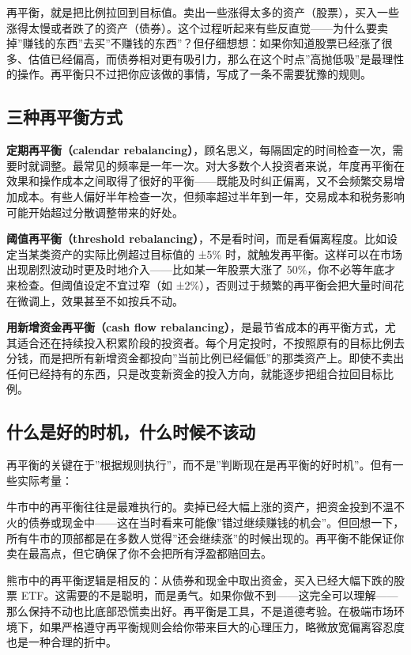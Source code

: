\documentclass[a4paper,11pt,oneside,fontset=none,UTF8,zihao=-4]{ctexbook}
\begin{document}
再平衡，就是把比例拉回到目标值。卖出一些涨得太多的资产（股票），买入一些涨得太慢或者跌了的资产（债券）。这个过程听起来有些反直觉------为什么要卖掉''赚钱的东西''去买''不赚钱的东西''？但仔细想想：如果你知道股票已经涨了很多、估值已经偏高，而债券相对更有吸引力，那么在这个时点''高抛低吸''是最理性的操作。再平衡只不过把你应该做的事情，写成了一条不需要犹豫的规则。

\subsection{三种再平衡方式}\label{ux4e09ux79cdux518dux5e73ux8861ux65b9ux5f0f}

\textbf{定期再平衡（calendar
rebalancing）}，顾名思义，每隔固定的时间检查一次，需要时就调整。最常见的频率是一年一次。对大多数个人投资者来说，年度再平衡在效果和操作成本之间取得了很好的平衡------既能及时纠正偏离，又不会频繁交易增加成本。有些人偏好半年检查一次，但频率超过半年到一年，交易成本和税务影响可能开始超过分散调整带来的好处。

\textbf{阈值再平衡（threshold
rebalancing）}，不是看时间，而是看偏离程度。比如设定当某类资产的实际比例超过目标值的
±5\%
时，就触发再平衡。这样可以在市场出现剧烈波动时更及时地介入------比如某一年股票大涨了
50\%，你不必等年底才来检查。但阈值设定不宜过窄（如
±2\%），否则过于频繁的再平衡会把大量时间花在微调上，效果甚至不如按兵不动。

\textbf{用新增资金再平衡（cash flow
rebalancing）}，是最节省成本的再平衡方式，尤其适合还在持续投入积累阶段的投资者。每个月定投时，不按照原有的目标比例去分钱，而是把所有新增资金都投向''当前比例已经偏低''的那类资产上。即使不卖出任何已经持有的东西，只是改变新资金的投入方向，就能逐步把组合拉回目标比例。

\subsection{什么是好的时机，什么时候不该动}\label{ux4ec0ux4e48ux662fux597dux7684ux65f6ux673aux4ec0ux4e48ux65f6ux5019ux4e0dux8be5ux52a8}

再平衡的关键在于''根据规则执行''，而不是''判断现在是再平衡的好时机''。但有一些实际考量：

牛市中的再平衡往往是最难执行的。卖掉已经大幅上涨的资产，把资金投到不温不火的债券或现金中------这在当时看来可能像''错过继续赚钱的机会''。但回想一下，所有牛市的顶部都是在多数人觉得''还会继续涨''的时候出现的。再平衡不能保证你卖在最高点，但它确保了你不会把所有浮盈都赔回去。

熊市中的再平衡逻辑是相反的：从债券和现金中取出资金，买入已经大幅下跌的股票
ETF。这需要的不是聪明，而是勇气。如果你做不到------这完全可以理解------那么保持不动也比底部恐慌卖出好。再平衡是工具，不是道德考验。在极端市场环境下，如果严格遵守再平衡规则会给你带来巨大的心理压力，略微放宽偏离容忍度也是一种合理的折中。
\end{document}
